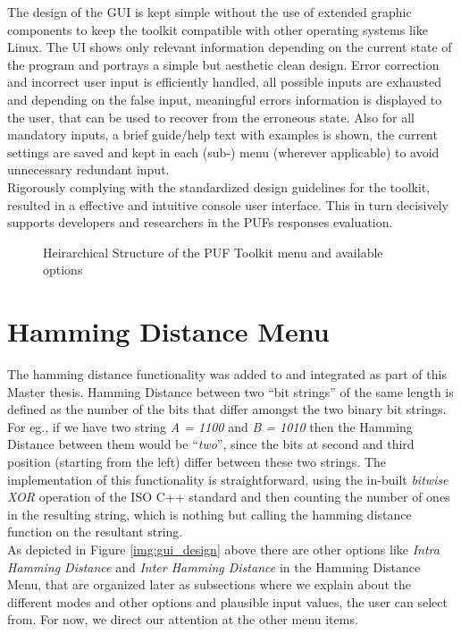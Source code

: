 The design of the GUI is kept simple without the use of extended graphic components to keep the toolkit compatible with other operating systems like Linux. The UI shows only relevant information depending on the current state of the program and portrays a simple but aesthetic clean design. Error correction and incorrect user input is efficiently handled, all possible inputs are exhausted and depending on the false input, meaningful errors information is displayed to the user, that can be used to
recover from the erroneous state. Also for all mandatory inputs, a brief guide/help text with examples is shown, the current settings are saved and kept in each (sub-) menu (wherever applicable) to avoid unnecessary redundant input.\\

Rigorously complying with the standardized design guidelines for the toolkit, resulted in a effective and intuitive console user interface.
This in turn decisively supports developers and researchers in the PUFs responses evaluation.\cite{71}

\begin{figure}
\centering
{}

\caption{Heirarchical Structure of the PUF Toolkit menu and available options}
\label{img:puf_menu}
\end{figure}

\section{Hamming Distance Menu}
\label{Hamming_Distance_menu}
The hamming distance functionality was added to and integrated as part of this Master thesis. Hamming Distance between two ``bit strings'' of the same length is defined as the number of the bits that differ amongst the two binary bit strings. For eg., if we have two string \emph{A = 1100} and \emph{B = 1010} then the Hamming Distance between them would be ``\emph{two}'', since the bits at second and third position (starting from the left) differ between these two strings. The implementation of
this functionality is straightforward, using the in-built \emph{bitwise XOR} operation of the ISO C++ standard and then counting the number of ones in the resulting string, which is nothing but calling the hamming distance function on the resultant string.\\

As depicted in Figure \ref{img:gui_design} above there are other options like \emph{Intra Hamming Distance} and \emph{Inter Hamming Distance} in the Hamming Distance Menu, that are organized later as subsections where we explain about the different modes and other options and plausible input values, the user can select from. For now, we direct our attention at the other menu items.\\

